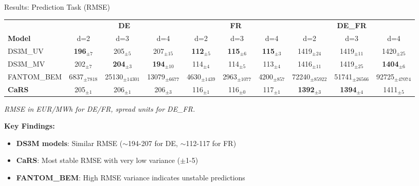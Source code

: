 \documentclass[aspectratio=169]{beamer}
\begin{document}
\begin{frame}{Results: Prediction Task (RMSE)}
\begin{table}
\centering
\small
\begin{adjustbox}{max width=\textwidth}
\begin{tabular}{l|ccc|ccc|ccc}
\toprule
& \multicolumn{3}{c|}{\textbf{DE}} & \multicolumn{3}{c|}{\textbf{FR}} & \multicolumn{3}{c}{\textbf{DE\_FR}} \\
\textbf{Model} & d=2 & d=3 & d=4 & d=2 & d=3 & d=4 & d=2 & d=3 & d=4 \\
\midrule
DS3M\_UV & \textbf{196}$_{\pm7}$ & 205$_{\pm5}$ & 207$_{\pm15}$ & \textbf{112}$_{\pm5}$ & \textbf{115}$_{\pm6}$ & \textbf{115}$_{\pm3}$ & 1419$_{\pm24}$ & 1419$_{\pm11}$ & 1420$_{\pm25}$ \\
DS3M\_MV & 202$_{\pm7}$ & \textbf{204}$_{\pm3}$ & \textbf{194}$_{\pm10}$ & 114$_{\pm4}$ & 114$_{\pm5}$ & 113$_{\pm4}$ & 1416$_{\pm11}$ & 1419$_{\pm25}$ & \textbf{1404}$_{\pm6}$ \\
FANTOM\_BEM & 6837$_{\pm7818}$ & 25130$_{\pm14301}$ & 13079$_{\pm6677}$ & 4630$_{\pm1439}$ & 2963$_{\pm1077}$ & 4200$_{\pm857}$ & 72240$_{\pm85922}$ & 51741$_{\pm26566}$ & 92725$_{\pm47074}$ \\
\midrule
\textbf{CaRS} & 205$_{\pm1}$ & 206$_{\pm1}$ & 206$_{\pm3}$ & 116$_{\pm1}$ & 116$_{\pm0}$ & 117$_{\pm1}$ & \textbf{1392}$_{\pm3}$ & \textbf{1394}$_{\pm4}$ & 1411$_{\pm5}$ \\
\bottomrule
\end{tabular}
\end{adjustbox}
\end{table}

\vspace{0.2cm}
{\scriptsize \textit{RMSE in EUR/MWh for DE/FR, spread units for DE\_FR.}} %

\vspace{0.2cm}
\textbf{Key Findings:}
\begin{itemize}
    \item \textbf{DS3M models}: Similar RMSE ($\sim$194-207 for DE, $\sim$112-117 for FR)
    \item \textbf{CaRS}: Most stable RMSE with very low variance ($\pm$1-5)
    \item \textbf{FANTOM\_BEM}: High RMSE variance indicates unstable predictions
\end{itemize}
\end{frame}
\end{document}
